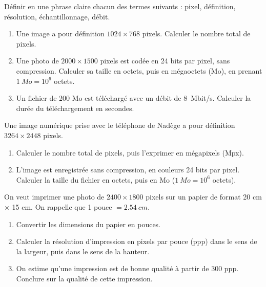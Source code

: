 \documentclass[11pt]{article}
\newcommand{\cle}[1]{{\popxbold\color{popdark}#1}}
\newcounter{popsec}
\newcounter{popsub}
\newcommand{\courssub}[1]{%
  \stepcounter{popsub}%
  \par\vspace{9pt}\noindent{\popxbold\fontsize{11.5}{13}\selectfont\color{popink}{\color{poporange}\thepopsec.\thepopsub}\hspace{6pt}#1}\par\nopagebreak\vspace{4pt}
}
\begin{document}
\begin{exercice}[Définitions]
Définir en une phrase claire chacun des termes suivants : \cle{pixel}, \cle{définition}, \cle{résolution}, \cle{échantillonnage}, \cle{débit}.
\end{exercice}

\begin{exercice}
\begin{enumerate}
\item Une image a pour définition $1024 \times 768$ pixels. Calculer le nombre total de pixels.
\item Une photo de $2000 \times 1500$ pixels est codée en 24 bits par pixel, sans compression. Calculer sa taille en octets, puis en mégaoctets (Mo), en prenant $\SI{1}{Mo} = 10^6$ octets.
\item Un fichier de 200 Mo est téléchargé avec un débit de \SI{8}{Mbit/s}. Calculer la durée du téléchargement en secondes.
\end{enumerate}
\end{exercice}

\courssub{Je m'entraîne}

\begin{exercice}
Une image numérique prise avec le téléphone de Nadège a pour définition $3264 \times 2448$ pixels.
\begin{enumerate}
\item Calculer le nombre total de pixels, puis l'exprimer en mégapixels (Mpx).
\item L'image est enregistrée sans compression, en couleurs 24 bits par pixel. Calculer la taille du fichier en octets, puis en Mo ($\SI{1}{Mo} = 10^6$ octets).
\end{enumerate}
\end{exercice}

\begin{exercice}
On veut imprimer une photo de $2400 \times 1800$ pixels sur un papier de format 20 cm $\times$ 15 cm. On rappelle que 1 pouce $= \SI{2,54}{cm}$.
\begin{enumerate}
\item Convertir les dimensions du papier en pouces.
\item Calculer la résolution d'impression en pixels par pouce (ppp) dans le sens de la largeur, puis dans le sens de la hauteur.
\item On estime qu'une impression est de bonne qualité à partir de 300 ppp. Conclure sur la qualité de cette impression.
\end{enumerate}
\end{exercice}
\end{document}
